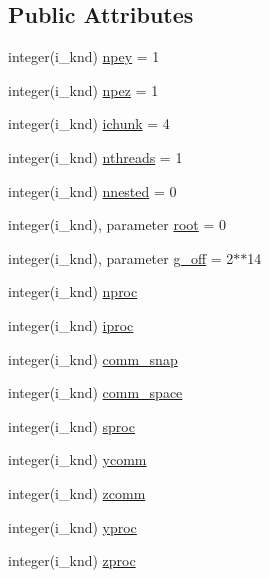 \subsection*{Public Attributes}
\begin{DoxyCompactItemize}
\item 
integer(i\-\_\-knd) \hyperlink{classplib__module_a90134f6aac88ad1d7341e79cbf8426f1}{npey} = 1
\item 
integer(i\-\_\-knd) \hyperlink{classplib__module_ab827d3c46ffc494381bb0962d304561a}{npez} = 1
\item 
integer(i\-\_\-knd) \hyperlink{classplib__module_a0982ec611aac37b53db96a8266ff5c48}{ichunk} = 4
\item 
integer(i\-\_\-knd) \hyperlink{classplib__module_aac4e1911c67e39262528b4ebf471997d}{nthreads} = 1
\item 
integer(i\-\_\-knd) \hyperlink{classplib__module_a1fc540917e4a4c7e8677f74d81a58fc4}{nnested} = 0
\item 
integer(i\-\_\-knd), parameter \hyperlink{classplib__module_a4216863984e9df981d4a2d5a51020ce5}{root} = 0
\item 
integer(i\-\_\-knd), parameter \hyperlink{classplib__module_aa3f6bda8ab61c2acbdaf18afe105dbae}{g\-\_\-off} = 2$\ast$$\ast$14
\item 
integer(i\-\_\-knd) \hyperlink{classplib__module_ae01601bf17ba60fbd8ec154182186409}{nproc}
\item 
integer(i\-\_\-knd) \hyperlink{classplib__module_a20a10200b84fc53b3f9703d080eb4f41}{iproc}
\item 
integer(i\-\_\-knd) \hyperlink{classplib__module_a9819445413d7afeb56953bd9fe427854}{comm\-\_\-snap}
\item 
integer(i\-\_\-knd) \hyperlink{classplib__module_aa5bc6028743a524c4466548e276cb839}{comm\-\_\-space}
\item 
integer(i\-\_\-knd) \hyperlink{classplib__module_aa3b6e5883dfa628f71771e9e6ee3e722}{sproc}
\item 
integer(i\-\_\-knd) \hyperlink{classplib__module_af98dd05eb9d15041b5c783c6be090495}{ycomm}
\item 
integer(i\-\_\-knd) \hyperlink{classplib__module_aecf72186ecae9823c0bbe21808acb840}{zcomm}
\item 
integer(i\-\_\-knd) \hyperlink{classplib__module_a75e3d1fe13879374c5966909045b4670}{yproc}
\item 
integer(i\-\_\-knd) \hyperlink{classplib__module_abce2abcf8d84587f2d4a066fa1287d81}{zproc}
\item 
$$
\end{DoxyCompactItemize}
